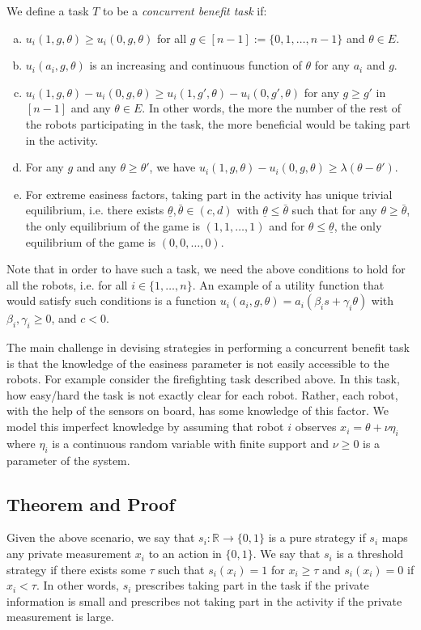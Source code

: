 \documentclass[conference]{ieeeconf}
\def\R{\mathbb{R}}
\begin{document}
We define a task $T$ to be a \textit{concurrent benefit task} if: 
\begin{enumerate}[a.]
	\item $u_i(1,g,\theta)\geq u_i(0,g,\theta)$ for all $g\in[n-1]:=\{0,1,\ldots,n-1\}$ and $\theta \in E$. 
	\item $u_i(a_i,g,\theta)$ is an increasing and continuous function of $\theta$ for any $a_i$ and $g$. 
	\item $u_i(1,g,\theta)-u_i(0,g,\theta)\geq u_i(1,g',\theta)-u_i(0,g',\theta)$ for any $g\geq g'$ in $[n-1]$ and any $\theta\in E$. In other words, the more the number of the rest of the robots participating in the task, the more beneficial would be taking part in the activity.
	\item For any $g$ and any $\theta\geq \theta'$, we have $u_i(1,g,\theta)-u_i(0,g,\theta)\geq \lambda (\theta-\theta')$. 
	\item For extreme easiness factors, taking part in the activity has unique trivial equilibrium, i.e. there exists $\underline{\theta},\bar{\theta}\in (c,d)$ with $\underline{\theta}\leq \bar{\theta}$ such that for any $\theta\geq \bar{\theta}$, the only equilibrium of the game is $(1,1,\ldots,1)$ and for $\theta\leq \underline{\theta}$, the only equilibrium of the game is $(0,0,\ldots,0)$.
\end{enumerate}

Note that in order to have such a task, we need the above conditions to hold for all the robots, i.e. for all $i\in\{1,\ldots,n\}$.
An example of a utility function that would satisfy such conditions is a function $u_i(a_i,g,\theta)=a_i(\beta_is+\gamma_i\theta)$ with $\beta_i,\gamma_i\geq 0$, and $c<0$.

The main challenge in devising strategies in performing a concurrent benefit task is that the knowledge of the easiness parameter is not easily accessible to the robots. For example consider the firefighting task described above. In this task, how easy/hard the task is not exactly clear for each robot. Rather, each robot, with the help of the sensors on board, has some knowledge of this factor. We model this imperfect knowledge by assuming that robot $i$ observes $x_i=\theta+\nu \eta_i$ where $\eta_i$ is a continuous random variable with finite support and $\nu\geq 0$ is a parameter of the system. 

\subsection{Theorem and Proof}\label{sec:thmproof}
Given the above scenario, we say that $s_i:\R\to \{0,1\}$ is a pure strategy if  $s_i$ maps any private measurement $x_i$ to an action in $\{0,1\}$. We say that $s_i$ is a threshold strategy if there exists some $\tau$ such that $s_i(x_i)=1$ for $x_i\geq \tau$ and $s_i(x_i)=0$ if $x_i<\tau$. In other words, $s_i$ prescribes taking part in the task if the private information is small and prescribes not taking part in the activity if the private measurement is large. 
\end{document}
